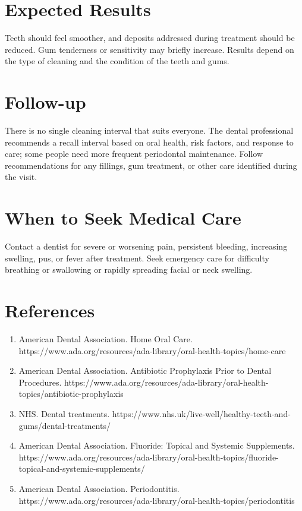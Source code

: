 \section*{Expected Results}
Teeth should feel smoother, and deposits addressed during treatment should be reduced. Gum tenderness or sensitivity may briefly increase. Results depend on the type of cleaning and the condition of the teeth and gums.

\section*{Follow-up}
There is no single cleaning interval that suits everyone. The dental professional recommends a recall interval based on oral health, risk factors, and response to care; some people need more frequent periodontal maintenance. Follow recommendations for any fillings, gum treatment, or other care identified during the visit.

\section*{When to Seek Medical Care}
Contact a dentist for severe or worsening pain, persistent bleeding, increasing swelling, pus, or fever after treatment. Seek emergency care for difficulty breathing or swallowing or rapidly spreading facial or neck swelling.

\section*{References}
\begin{enumerate}
  \item American Dental Association. Home Oral Care. https://www.ada.org/resources/ada-library/oral-health-topics/home-care
  \item American Dental Association. Antibiotic Prophylaxis Prior to Dental Procedures. https://www.ada.org/resources/ada-library/oral-health-topics/antibiotic-prophylaxis
  \item NHS. Dental treatments. https://www.nhs.uk/live-well/healthy-teeth-and-gums/dental-treatments/
  \item American Dental Association. Fluoride: Topical and Systemic Supplements. https://www.ada.org/resources/ada-library/oral-health-topics/fluoride-topical-and-systemic-supplements/
  \item American Dental Association. Periodontitis. https://www.ada.org/resources/ada-library/oral-health-topics/periodontitis
\end{enumerate}

\clearpage
